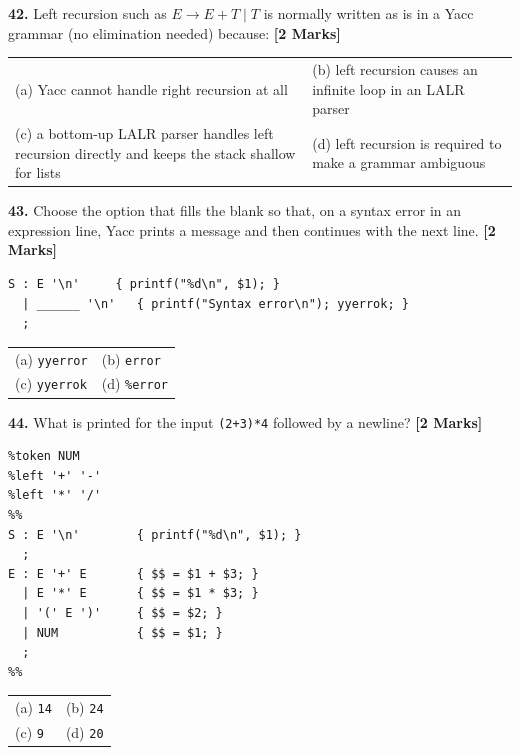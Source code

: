 \documentclass[11pt,a4paper]{article}
\begin{document}
\vspace{0.22cm}

\noindent \textbf{42.} Left recursion such as $E \rightarrow E + T \mid T$ is normally written as is in a Yacc grammar (no elimination needed) because: \hfill \textbf{[2 Marks]}
\vspace{0.06cm}
\noindent
\begin{tabularx}{\textwidth}{@{}X X@{}}
(a) Yacc cannot handle right recursion at all & (b) left recursion causes an infinite loop in an LALR parser \\[3pt]
(c) a bottom-up LALR parser handles left recursion directly and keeps the stack shallow for lists & (d) left recursion is required to make a grammar ambiguous \\
\end{tabularx}

\vspace{0.22cm}

\noindent \textbf{43.} Choose the option that fills the blank so that, on a syntax error in an expression line, Yacc prints a message and then continues with the next line. \hfill \textbf{[2 Marks]}
\begin{lstlisting}
S : E '\n'     { printf("%d\n", $1); }
  | ______ '\n'   { printf("Syntax error\n"); yyerrok; }
  ;
\end{lstlisting}
\vspace{0.06cm}
\noindent
\begin{tabularx}{\textwidth}{@{}X X@{}}
(a) \texttt{yyerror} & (b) \texttt{error} \\[3pt]
(c) \texttt{yyerrok} & (d) \texttt{\%error} \\
\end{tabularx}

\vspace{0.22cm}

\noindent \textbf{44.} What is printed for the input \texttt{(2+3)*4} followed by a newline? \hfill \textbf{[2 Marks]}
\begin{lstlisting}
%token NUM
%left '+' '-'
%left '*' '/'
%%
S : E '\n'        { printf("%d\n", $1); }
  ;
E : E '+' E       { $$ = $1 + $3; }
  | E '*' E       { $$ = $1 * $3; }
  | '(' E ')'     { $$ = $2; }
  | NUM           { $$ = $1; }
  ;
%%
\end{lstlisting}
\vspace{0.06cm}
\noindent
\begin{tabularx}{\textwidth}{@{}X X@{}}
(a) \texttt{14} & (b) \texttt{24} \\[3pt]
(c) \texttt{9} & (d) \texttt{20} \\
\end{tabularx}
\end{document}
